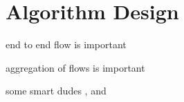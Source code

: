 \chapter{Algorithm Design}

end to end flow is important

aggregation of flows is important

some smart dudes \cite{bonsma:ufp}, \cite{anag:mazing} and \cite{chakrabarti:ufp}
